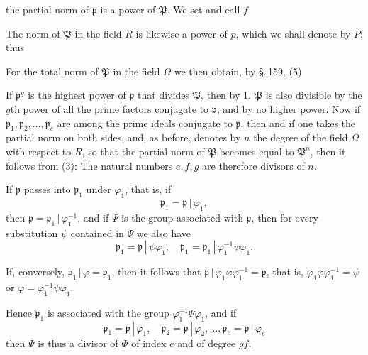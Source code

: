 the partial norm of $\mathfrak{p}$ is a power of $\mathfrak{P}$. We set
and call $f$ 

The norm of $\mathfrak{P}$ in the field $R$ is likewise a power of $p$, which we shall denote by $P$; thus

For the total norm of $\mathfrak{P}$ in the field $\Omega$ we then obtain, by \S.\,159, (5) %

If $\mathfrak{p}^g$ is the highest power of $\mathfrak{p}$ that divides $\mathfrak{P}$, then by 1. $\mathfrak{P}$ is also divisible by the $g$th power of all the prime factors conjugate to $\mathfrak{p}$, and by no higher power. Now if $\mathfrak{p}_1, \mathfrak{p}_2, \ldots, \mathfrak{p}_e$ are  among the prime ideals conjugate to $\mathfrak{p}$, then
and if one takes the partial norm on both sides, and, as before, denotes by $n$ the degree of the field $\Omega$ with respect to $R$, so that the partial norm of $\mathfrak{P}$ becomes equal to $\mathfrak{P}^n$, then it follows from (3):
The natural numbers $e, f, g$ are therefore divisors of $n$.

If $\mathfrak{p}$ passes into $\mathfrak{p}_1$ under $\varphi_1$, that is, if
\[
\mathfrak{p}_1 = \mathfrak{p} \,|\, \varphi_1,
\]
then $\mathfrak{p} = \mathfrak{p}_1 \,|\, \varphi_1^{-1}$, and if $\Psi$ is the group associated with $\mathfrak{p}$, then for every substitution $\psi$ contained in $\Psi$ we also have
\[
\mathfrak{p}_1 = \mathfrak{p} \,|\, \psi \varphi_1, \quad \mathfrak{p}_1 = \mathfrak{p}_1 \,|\, \varphi_1^{-1} \psi \varphi_1.
\]

If, conversely, $\mathfrak{p}_1 \,|\, \varphi = \mathfrak{p}_1$, then it follows that $\mathfrak{p} \,|\, \varphi_1 \varphi \varphi_1^{-1} = \mathfrak{p}$, that is, $\varphi_1 \varphi \varphi_1^{-1} = \psi$ or $\varphi = \varphi_1^{-1} \psi \varphi_1$.

Hence $\mathfrak{p}_1$ is associated with the group $\varphi_1^{-1} \Psi \varphi_1$, and if
\[
\mathfrak{p}_1 = \mathfrak{p} \,|\, \varphi_1, \quad \mathfrak{p}_2 = \mathfrak{p} \,|\, \varphi_2, \ldots, \mathfrak{p}_e = \mathfrak{p} \,|\, \varphi_e
\]
then
$\Psi$ is thus a divisor of $\Phi$ of index $e$ and of degree $gf$.
